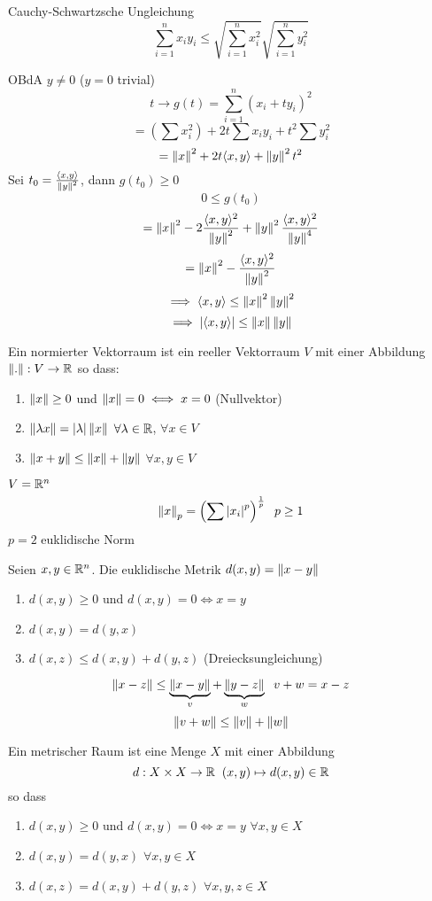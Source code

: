 \begin{Sat}{Cauchy-Schwartzsche Ungleichung}
  \[\sum^n_{i=1}x_iy_i\leq\sqrt{\sum_{i=1}^nx_i^2}\sqrt{\sum_{i=1}^ny_i^2}\]
\end{Sat}
\begin{Bew}
  OBdA $y\neq 0$ ($y=0$ trivial)
  \[t\to g(t)=\sum_{i=1}^n(x_i+ty_i)^2\]
  \[=\left( \sum x_i^2 \right)+2t\sum x_iy_i+t^2\sum y_i^2\]
  \[=\left\| x \right\|^2+2t\langle x,y \rangle+\left\| y \right\|^2t^2\]
  Sei $t_0=\frac{\langle x,y \rangle}{\left\| y \right\|^2}$, dann $g(t_0)\geq 0$
  \[0\leq g(t_0)\]
  \[=\left\| x \right\|^2-2\frac{\langle x,y \rangle^2}{\left\| y \right\|^2}+\left\| y \right\|^2\frac{\langle x,y \rangle^2}{\left\| y \right\|^4}\]
  \[=\left\| x \right\|^2-\frac{\langle x,y \rangle^2}{\left\| y \right\|^2}\]
  \[\implies \langle x,y \rangle\leq\left\| x \right\|^2\left\| y \right\|^2\]
  \[\implies \left| \langle x,y \rangle \right|\leq\left\| x \right\|\left\| y \right\|\]
\end{Bew}
\begin{Def}
  Ein normierter Vektorraum ist ein reeller Vektorraum $V$ mit einer Abbildung $\left\| . \right\| :V\rightarrow\mathbb{R}$ so dass:
  \begin{enumerate}
    \item $\left\| x \right\|\geq 0$ und $\left\| x \right\|=0\iff x=0$ (Nullvektor)
    \item $\left\| \lambda x \right\|=\mathopen| \lambda \mathclose|\left\| x \right\|$ $\forall \lambda\in\mathbb{R}$, $\forall x\in V$
    \item $\left\| x+y \right\|\leq\left\| x \right\|+\left\| y \right\|$ $\forall x,y\in V$
  \end{enumerate}
\end{Def}
\begin{Bsp}
  $V=\mathbb{R}^n$
  \[\left\| x \right\|_p=\left(\sum\left| x_i \right|^p\right)^{\frac{1}{p}}\hspace{2mm} p\geq 1\]
  $p=2$ euklidische Norm
\end{Bsp}
\begin{Def}
  Seien $x,y\in\mathbb{R}^n$. Die euklidische Metrik $d(x,y)=\left\| x-y \right\|$
\end{Def}
\begin{Lem}
  \begin{enumerate}
    \item $d(x,y)\geq 0$ und $d(x,y)=0\iff x=y$
    \item $d(x,y)=d(y,x)$
    \item $d(x,z)\leq d(x,y)+d(y,z)$ (Dreiecksungleichung)
  \end{enumerate}
\end{Lem}
\begin{Bew}
  \[\left\| x-z \right\|\leq\underbrace{\left\| x-y \right\|}_v+\underbrace{\left\| y-z \right\|}_w\hspace{2mm} v+w=x-z\]
  \[\left\| v+w \right\|\leq\left\| v \right\|+\left\| w \right\|\]
\end{Bew}
\begin{Def}
  Ein metrischer Raum ist eine Menge $X$ mit einer Abbildung
  \[d:X\times X\rightarrow\mathbb{R}\hspace{2mm} (x,y)\mapsto d(x,y)\in\mathbb{R}\]so dass
  \begin{enumerate}
    \item $d(x,y)\geq 0$ und $d(x,y)=0\iff x=y$ $\forall x,y\in X$
    \item $d(x,y)=d(y,x)$ $\forall x,y\in X$
    \item $d(x,z)=d(x,y)+d(y,z)$ $\forall x,y,z\in X$
  \end{enumerate}
\end{Def}
